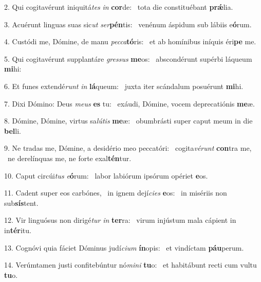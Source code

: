 2. Qui cogitavérunt iniquitá\textit{tes} \textit{in} \textbf{cor}de: \ast\  tota die constituébant \textbf{prǽ}lia.\

3. Acuérunt linguas suas sic\textit{ut} \textit{ser}\textbf{pén}tis: \ast\  venénum áspidum sub lábiis e\textbf{ó}rum.\

4. Custódi me, Dómine, de manu \textit{pec}\textit{ca}\textbf{tó}ris: \ast\  et ab homínibus iníquis éri\textbf{pe} me.\

5. Qui cogitavérunt supplantáre \textit{gres}\textit{sus} \textbf{me}os: \ast\  abscondérunt supérbi láqueum \textbf{mi}hi:\

6. Et funes extendé\textit{runt} \textit{in} \textbf{lá}queum: \ast\  juxta iter scándalum posuérunt \textbf{mi}hi.\

7. Dixi Dómino: Deus \textit{me}\textit{us} \textbf{es} tu: \ast\  exáudi, Dómine, vocem deprecatiónis \textbf{me}æ.\

8. Dómine, Dómine, virtus sa\textit{lú}\textit{tis} \textbf{me}æ: \ast\  obumbrásti super caput meum in die \textbf{bel}li.\

9. Ne tradas me, Dómine, a desidério meo peccatóri: \dag\  cogita\textit{vé}\textit{runt} \textbf{con}tra me, \ast\  ne derelínquas me, ne forte exal\textbf{tén}tur.\

10. Caput circúi\textit{tus} \textit{e}\textbf{ó}rum: \ast\  labor labiórum ipsórum opériet \textbf{e}os.\

11. Cadent super eos carbónes, \dag\  in ignem dejí\textit{ci}\textit{es} \textbf{e}os: \ast\  in misériis non sub\textbf{sís}tent.\

12. Vir linguósus non dirigé\textit{tur} \textit{in} \textbf{ter}ra: \ast\  virum injústum mala cápient in in\textbf{tér}itu.\

13. Cognóvi quia fáciet Dóminus judí\textit{ci}\textit{um} \textbf{ín}opis: \ast\  et vindíctam \textbf{páu}perum.\

14. Verúmtamen justi confitebúntur nó\textit{mi}\textit{ni} \textbf{tu}o: \ast\  et habitábunt recti cum vultu \textbf{tu}o.\

